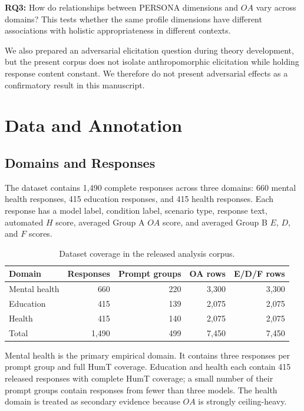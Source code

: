\documentclass[manuscript,review,anonymous]{acmart}
\begin{document}
\textbf{RQ3:} How do relationships between PERSONA dimensions and $OA$ vary across domains? This tests whether the same profile dimensions have different associations with holistic appropriateness in different contexts.

We also prepared an adversarial elicitation question during theory development, but the present corpus does not isolate anthropomorphic elicitation while holding response content constant. We therefore do not present adversarial effects as a confirmatory result in this manuscript.

\section{Data and Annotation}
\subsection{Domains and Responses}
The dataset contains 1,490 complete responses across three domains: 660 mental health responses, 415 education responses, and 415 health responses. Each response has a model label, condition label, scenario type, response text, automated $H$ score, averaged Group A $OA$ score, and averaged Group B $E$, $D$, and $F$ scores.

\begin{table}
\caption{Dataset coverage in the released analysis corpus.}
\label{tab:dataset}
\begin{tabular}{lrrrr}
\toprule
Domain & Responses & Prompt groups & OA rows & E/D/F rows \\
\midrule
Mental health & 660 & 220 & 3,300 & 3,300 \\
Education & 415 & 139 & 2,075 & 2,075 \\
Health & 415 & 140 & 2,075 & 2,075 \\
\midrule
Total & 1,490 & 499 & 7,450 & 7,450 \\
\bottomrule
\end{tabular}
\end{table}

Mental health is the primary empirical domain. It contains three responses per prompt group and full HumT coverage. Education and health each contain 415 released responses with complete HumT coverage; a small number of their prompt groups contain responses from fewer than three models. The health domain is treated as secondary evidence because $OA$ is strongly ceiling-heavy.
\end{document}
